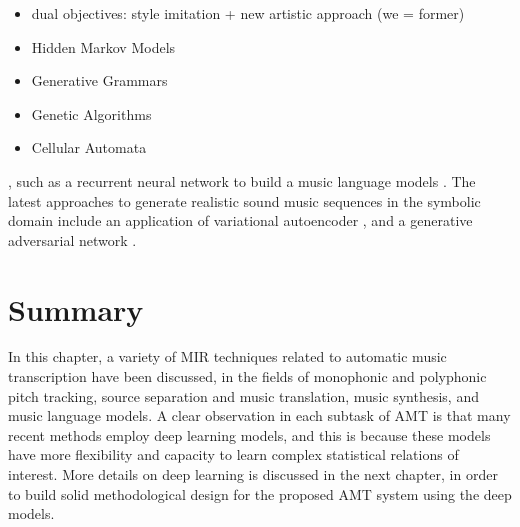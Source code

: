 \begin{itemize}
	\item dual objectives: style imitation + new artistic approach (we = former)
	\item Hidden Markov Models \cite{farbood2001markov}
	\item Generative Grammars \cite{chemilier2001grammar}
	\item Genetic Algorithms \cite{miranda2007evolutionary}
	\item Cellular Automata \cite{burraston2004automata}
\end{itemize}

, such as a recurrent neural network to build a music language models \cite{sigtia2014lm}.
The latest approaches to generate realistic sound music sequences in the symbolic domain include an application of variational autoencoder \cite{teng2017generating,tikhonov2017generation}, and a generative adversarial network \cite{yang2017midinet}.

\section{Summary}

In this chapter, a variety of MIR techniques related to automatic music transcription have been discussed, in the fields of monophonic and polyphonic pitch tracking, source separation and music translation, music synthesis, and music language models.
A clear observation in each subtask of AMT is that many recent methods employ deep learning models, and this is because these models have more flexibility and capacity to learn complex statistical relations of interest.
More details on deep learning is discussed in the next chapter, in order to build solid methodological design for the proposed AMT system using the deep models.